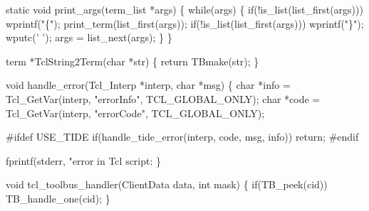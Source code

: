 \nwenddocs{}\endmoddef\let\nwnotused=\nwoutput{}
static void print_args(term_list *args)
\{
  while(args) \{
    if(!is_list(list_first(args)))
      wprintf("\{");
    print_term(list_first(args));
    if(!is_list(list_first(args)))
      wprintf("\}");
    wputc(' ');
    args = list_next(args);
  \}
\}
\nwendcode{}\nwdocspar




\nwenddocs{}\endmoddef\let\nwnotused=\nwoutput{}

term *TclString2Term(char *str)
\{
  return TBmake(str);
\}

\nwendcode{}\nwdocspar



\nwenddocs{}\endmoddef\let\nwnotused=\nwoutput{}
void handle_error(Tcl_Interp *interp, char *msg)
\{
  char *info = Tcl_GetVar(interp, "errorInfo", TCL_GLOBAL_ONLY);
  char *code = Tcl_GetVar(interp, "errorCode", TCL_GLOBAL_ONLY);

#ifdef USE_TIDE
  if(handle_tide_error(interp, code, msg, info))
    return;
#endif

  fprintf(stderr, "error in Tcl script: %
\}
\nwendcode{}\nwdocspar


\nwenddocs{}\endmoddef\let\nwnotused=\nwoutput{}
void tcl_toolbus_handler(ClientData data, int mask)
\{
  if(TB_peek(cid))
    TB_handle_one(cid);
\}
\nwendcode{}\nwdocspar

